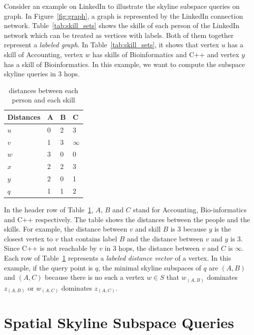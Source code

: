 Consider an example on LinkedIn to illustrate the skyline subspace queries on graph. In Figure~\ref{fig:graph}, a graph is represented by the LinkedIn connection network. Table~\ref{tab:skill_sets} shows the skills of each person of the LinkedIn network which can be treated as vertices with labels. 
Both of them together represent a \emph{labeled graph}. In Table~\ref{tab:skill_sets}, it shows that vertex $u$ has a skill of Accounting, vertex $w$ has skills of Bioinformatics and C++ and vertex $y$ has a skill of Bioinformatics. In this example, we want to compute the subspace skyline queries in $3$ hops.

\begin{table}[h]
    \centering
    \begin{tabular}{llll}
    \hline
        Distances & A & B & C \\ \hline
        $u$       & 0 & 2 & 3 \\ \hline
        $v$       & 1 & 3 & $\infty$ \\ \hline
        $w$       & 3 & 0 & 0 \\ \hline
        $x$       & 2 & 2 & 3 \\ \hline
        $y$       & 2 & 0 & 1 \\ \hline
        $q$       & 1 & 1 & 2 \\ \hline
    \end{tabular}
    \caption{distances between each person and each skill}
    \label{tab:distances_graph}
\end{table}

In the header row of Table~\ref{tab:distances_graph}, $A$, $B$ and $C$ stand for Accounting, Bio-informatics and C++ respectively. The table shows the distances between the people and the skills. For example, the distance between $v$ and skill $B$ is $3$ because $y$ is the closest vertex to $v$ that contains label $B$ and the distance between $v$ and $y$ is $3$. Since C++ is not reachable by $v$ in $3$ hops, the distance between $v$ and $C$ is $\infty$. Each row of Table~\ref{tab:distances_graph} represents a \emph{labeled distance vector} of a vertex.
In this example, if the query point is $q$, the minimal skyline subspaces of $q$ are $(A, B)$ and $(A, C)$ because there is no such a vertex $w \in S$ that $w_{(A,B)}$ dominates $z_{(A,B)}$ or $w_{(A,C)}$ dominates $z_{(A,C)}$.


\section{Spatial Skyline Subspace Queries}

